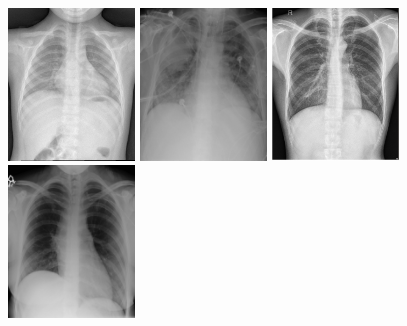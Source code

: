 \documentclass[12pt,twoside,a4paper]{report}
\begin{document}
\begin{figure}
  \centering
  \includegraphics[width=0.3\textwidth]{images/normal1}\hspace{0.01\textwidth}%
  \includegraphics[width=0.3\textwidth]{images/consolidation_original}\hspace{0.01\textwidth}%
  \includegraphics[width=0.3\textwidth]{images/TB_original}\\[0.01\textwidth]
  \includegraphics[width=0.3\textwidth]{images/normal2}\hspace{0.01\textwidth}%

\end{figure}
\end{document}
